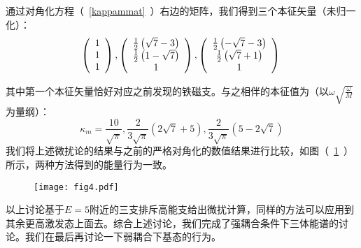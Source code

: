 通过对角化方程（~\ref{kappammat}~）右边的矩阵，我们得到三个本征矢量（未归一化）：
\begin{equation}
        \left(
            \begin{array}{c}
            1\\
            1\\
            1\\
            \end{array}
        \right),
        \left(
            \begin{array}{c}
            \frac{1}{2} \left(\sqrt{7}-3\right)\\
            \frac{1}{2} \left(1-\sqrt{7}\right)\\
            1\\
            \end{array}
        \right),
        \left(
            \begin{array}{c}
            \frac{1}{2} \left(-\sqrt{7}-3\right)\\
            \frac{1}{2} \left(\sqrt{7}+1\right)\\
            1\\
            \end{array}
        \right)\\
\end{equation}

其中第一个本征矢量恰好对应之前发现的铁磁支。与之相伴的本征值为（以$ \omega \sqrt{\frac{\omega}{M}}$为量纲）：
\begin{equation}
\kappa_m= \frac{10}{\sqrt{\pi}},\frac{2}{3\sqrt{\pi}} \left(2 \sqrt{7}+5\right),\frac{2}{3\sqrt{\pi}} \left(5-2 \sqrt{7}\right) 
\end{equation}
我们将上述微扰论的结果与之前的严格对角化的数值结果进行比较，如图（~\ref{fig:fig4}~）所示，两种方法得到的能量行为一致。
\begin{figure}[!htbp]
    \centering
    \texttt{[image: fig4.pdf]}
    \label{fig:fig4}
\end{figure}
以上讨论基于$E=5$附近的三支排斥高能支给出微扰计算，同样的方法可以应用到其余更高激发态上面去。综合上述讨论，我们完成了强耦合条件下三体能谱的讨论。我们在最后再讨论一下弱耦合下基态的行为。

